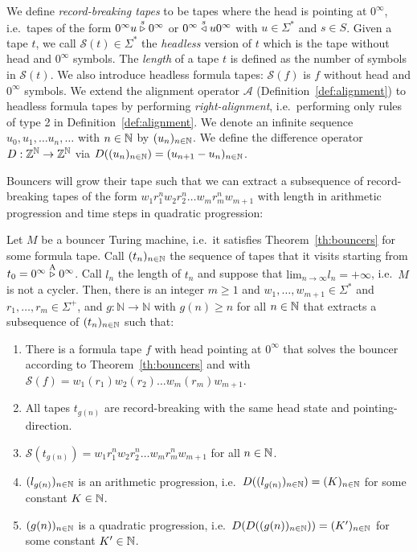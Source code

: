 We define \textit{record-breaking tapes} to be tapes where the head is pointing at $0^\infty$, i.e.\ tapes of the form $0^\infty u \stackrel{s}\triangleright 0^\infty$ or $0^\infty \stackrel{s}\triangleleft u 0^\infty$ with $u\in\Sigma^*$ and $s\in S$. Given a tape $t$, we call $\mathcal{S}(t) \in \Sigma^*$ the \textit{headless} version of $t$ which is the tape without head and $0^\infty$ symbols. The \textit{length} of a tape $t$ is defined as the number of symbols in $\mathcal{S}(t)$. We also introduce headless formula tapes: $\mathcal{S}(f)$ is $f$ without head and $0^\infty$ symbols. We extend the alignment operator $\mathcal{A}$ (Definition~\ref{def:alignment}) to headless formula tapes by performing \textit{right-alignment}, i.e.\ performing only rules of type 2 in Definition~\ref{def:alignment}. We denote an infinite sequence $u_0, u_1, \dots u_n, \dots$ with $n\in\mathbb{N}$ by $(u_n)_{n\in\mathbb{N}}$. We define the difference operator $D: \mathbb{Z}^{\mathbb{N}} \to \mathbb{Z}^{\mathbb{N}}$ via $D((u_n)_{n\in\mathbb{N}})=(u_{n+1}-u_{n})_{n\in\mathbb{N}}$.

Bouncers will grow their tape such that we can extract a subsequence of record-breaking tapes of the form $w_1 r_1^n w_2 r_2^n \dots w_m r_m^n w_{m+1}$ with length in arithmetic progression and time steps in quadratic progression:

\begin{theorem}\label{th:linquad}
    Let $M$ be a bouncer Turing machine, i.e.\ it satisfies Theorem~\ref{th:bouncers} for some formula tape. Call $(t_n)_{n\in\mathbb{N}}$ the sequence of tapes that it visits starting from $t_0 = 0^\infty \stackrel{\text{A}}\triangleright 0^\infty$. Call $l_n$ the length of $t_n$ and suppose that $\text{lim}_{n\to\infty} l_n = +\infty$, i.e.\ $M$ is not a cycler. Then, there is an integer $m \geq 1$ and $w_1, \dots, w_{m+1} \in \Sigma^*$ and $r_1, \dots, r_{m} \in \Sigma^+$, and $g: \mathbb{N} \to \mathbb{N}$ with $g(n) \geq n$ for all $n\in\mathbb{N}$ that extracts a subsequence of $(t_n)_{n\in\mathbb{N}}$ such that:

    \begin{enumerate}
        \item There is a formula tape $f$ with head pointing at $0^\infty$ that solves the bouncer according to Theorem~\ref{th:bouncers} and with $\mathcal{S}(f) = w_1 (r_1) w_2 (r_2) \dots w_m (r_m) w_{m+1} $.
        \item All tapes $t_{g(n)}$ are record-breaking with the same head state and pointing-direction.
        \item $\mathcal{S}(t_{g(n)})=w_1 r_1^n w_2 r_2^n \dots w_m r_m^n w_{m+1}$ for all $n\in\mathbb{N}$.

        \item $(l_{g(n)})_{n\in\mathbb{N}}$ is an arithmetic progression, i.e.\ $D((l_{g(n)})_{n\in\mathbb{N}}) = (K)_{n\in\mathbb{N}}$ for some constant $K\in\mathbb{N}$.
        \item $(g(n))_{n\in\mathbb{N}}$ is a quadratic progression, i.e.\ $D(D((g(n))_{n\in\mathbb{N}})) = (K')_{n\in\mathbb{N}}$ for some constant $K'\in\mathbb{N}$.
    \end{enumerate}
\end{theorem}

